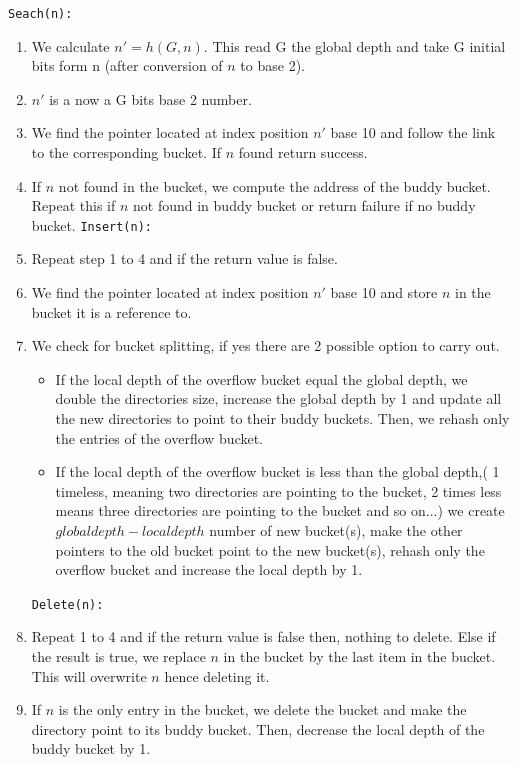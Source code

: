 \documentclass[a4paper,12pt, openany]{book}
\begin{document}
\hspace{.11in}\texttt{Seach(n):}
\begin{enumerate}
	\item We calculate $n' = h(G, n)$. This read G the global depth and take G initial bits form n (after conversion of $n$ to base 2). 
	\item $n'$ is a now a G bits base 2 number. 
	\item We find the pointer located at index position $n'$  base 10 and follow the link to the corresponding bucket. If $n$ found return success.
	\item If $n$ not found in the bucket, we compute the address of the buddy bucket. Repeat this if $n$ not found in buddy bucket or return failure if no buddy bucket.\bigbreak
	\texttt{Insert(n):}
	\item Repeat step 1 to 4 and if the return value is false. 
	\item We find the pointer located at index position  $n'$ base 10 and store $n$ in the bucket it is a reference to. 
	\item We check for bucket splitting, if yes there are 2 possible option to carry out. 
	\begin{itemize}
		\item  If the local depth of the overflow bucket equal the global depth, we double the directories size, increase the global depth by 1 and update all the new directories to point to their buddy buckets. Then, we rehash only the entries of the overflow bucket. 
		\item If the local depth of the overflow bucket is less than the global depth,( 1 timeless, meaning two directories are pointing to the bucket, 2 times less means three directories are pointing to the bucket and so on...) we create $global depth - local depth$ number of new bucket(s), make the other pointers to the old bucket point to the new bucket(s), rehash only the overflow bucket and increase the local depth by 1.
	\end{itemize}
	\texttt{Delete(n):}
	\item Repeat 1 to 4 and if the return value is false then, nothing to delete. Else if the result is true, we replace $n$ in the bucket by the last item in the bucket. This will overwrite $n$ hence deleting it. 
	\item If $n$ is the only entry in the bucket, we delete the bucket and make the directory point to its buddy bucket. Then, decrease the local depth of the buddy bucket by 1.
\end{enumerate}
\end{document}
